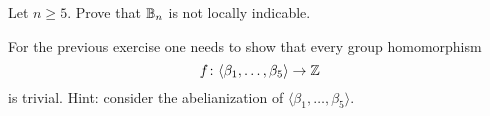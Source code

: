 \begin{exercise}
    Let $n\geq 5$. 
    Prove that $\mathbb{B}_n$ is not locally indicable.
\end{exercise}

For the previous exercise one needs to show that
every group homomorphism 
\[
f\colon \langle\beta_1,\dots,\beta_5\rangle\to\mathbb{Z}
\]
is trivial. Hint: consider
the abelianization of $\langle\beta_1,\dots,\beta_5\rangle$.

